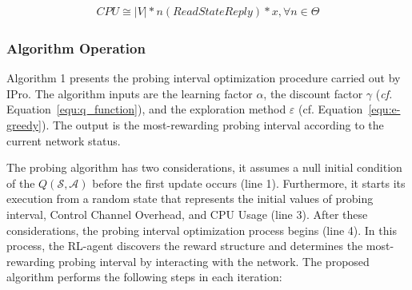 \begin{equation}
    \begin{split}
        CPU \cong \left | V \right |* n\left ( ReadStateReply \right ) * x,  \forall n \in \Theta
    \end{split}
     \label{equ:load_cpu}
\end{equation}

\subsubsection{Algorithm Operation}
\label{subsec:assumptions}
Algorithm 1 presents the probing interval optimization procedure carried out by IPro. The algorithm inputs are the learning factor $\alpha$, the discount factor $\gamma$ (\textit{cf.} Equation~\ref{equ:q_function}), and the exploration method $\varepsilon$ (cf. Equation~\ref{equ:e-greedy}). The output is the most-rewarding probing interval according to the current network status. 

The probing algorithm has two considerations, it assumes a null initial condition of the $Q(\mathcal{S},\mathcal{A})$ before the first update occurs (line 1). Furthermore, it starts its execution from a random state that represents the initial values of probing interval, Control Channel Overhead, and CPU Usage (line 3). After these considerations, the probing interval optimization process begins (line 4). In this process, the RL-agent discovers the reward structure and determines the most-rewarding probing interval by interacting with the network. The proposed algorithm performs the following steps in each iteration:


